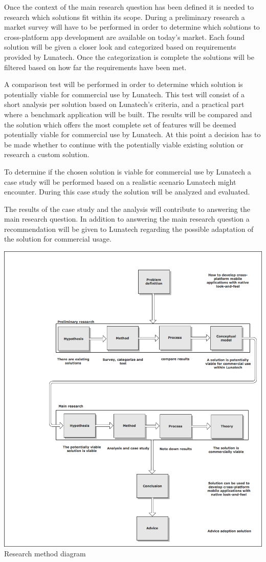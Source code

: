 Once the context of the main research question has been defined it is needed to research which solutions fit within its scope. During a preliminary research a market survey will have to be performed in order to determine which solutions to cross-platform app development are available on today's market. Each found solution will be given a closer look and categorized based on requirements provided by Lunatech. Once the categorization is complete the solutions will be filtered based on how far the requirements have been met.

A comparison test will be performed in order to determine which solution is potentially viable for commercial use by Lunatech. This test will consist of a short analysis per solution based on Lunatech's criteria, and a practical part where a benchmark application will be built. The results will be compared and the solution which offers the most complete set of features will be deemed potentially viable for commercial use by Lunatech. At this point a decision has to be made whether to continue with the potentially viable existing solution or research a custom solution. 

To determine if the chosen solution is viable for commercial use by Lunatech a case study will be performed based on a realistic scenario Lunatech might encounter. During this case study the solution will be analyzed and evaluated.

The results of the case study and the analysis will contribute to answering the main research question. In addition to answering the main research question a recommendation will be given to Lunatech regarding the possible adaptation of the solution for commercial usage.


\newpage
\begin{centering}
\includegraphics[scale=0.6]{images/researchprocess.png}\\{Research method diagram}\\
\end{centering}


